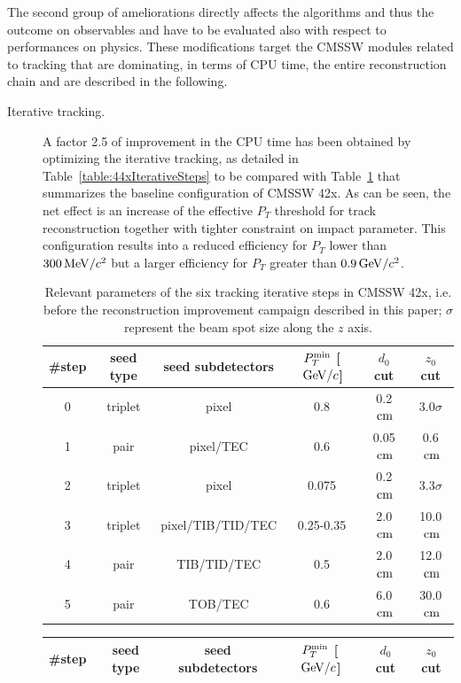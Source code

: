 The second group of ameliorations directly affects
the algorithms and thus the outcome on observables and have to
be evaluated also with respect to performances on physics. These
modifications target the CMSSW modules related to tracking that are
dominating, in terms of CPU time, the entire reconstruction chain and are
described in the following.
\begin{description}
\item[Iterative tracking.] A factor 2.5 of improvement in the CPU time
  has been obtained by optimizing the iterative tracking, as detailed
  in Table~\ref{table:44xIterativeSteps} to be compared with
  Table~\ref{table:42xIterativeSteps} that summarizes the baseline
  configuration of CMSSW 42x. As can be seen, the net effect is an
  increase of the effective $P_T$ threshold for track reconstruction
  together with tighter constraint on impact parameter. This
  configuration results into a reduced efficiency for $P_T$ lower than
  $300{\rm \, MeV}/c^2$ but a larger efficiency for $P_T$ greater than
  $0.9{\rm \, GeV}/c^2$.  
%
\begin{table}[b]
  \centering
  \begin{tabular}{cccccc}
  \#step & seed type & seed subdetectors & $P^{\rm min}_T$ [${\rm \, GeV}/c$] &
  $d_0$ cut & $z_0$ cut \\ \hline  
  0 & triplet & pixel & 0.8 & 0.2$\rm \, cm$ & 3.0$\sigma$ \\
  1 & pair    & pixel/TEC & 0.6 & 0.05$\rm \, cm$ & 0.6$\rm \, cm$ \\
  2 & triplet & pixel & 0.075 & 0.2$\rm \, cm$ & 3.3$\sigma$ \\
  3 & triplet & pixel/TIB/TID/TEC & 0.25-0.35 & 2.0$\rm \, cm$ & 10.0$\rm \, cm$ \\
  4 & pair    & TIB/TID/TEC & 0.5 & 2.0$\rm \, cm$ & 12.0$\rm \, cm$ \\
  5 & pair    & TOB/TEC & 0.6 & 6.0$\rm \, cm$ & 30.0$\rm \, cm$ \\
\end{tabular}
  \caption{Relevant parameters of the six tracking iterative steps in
    CMSSW 42x, i.e. before the reconstruction improvement campaign
    described in this paper; $\sigma$ represent the beam spot size
    along the $z$ axis.}
  \label{table:42xIterativeSteps}
\end{table}
%
\begin{table}[b]
  \centering
  \begin{tabular}{cccccc}
  \#step & seed type & seed subdetectors & $P^{\rm min}_T$ [${\rm \, GeV}/c$] &
  $d_0$ cut & $z_0$ cut \\ \hline  

\end{tabular}
\end{table}
\end{description}
